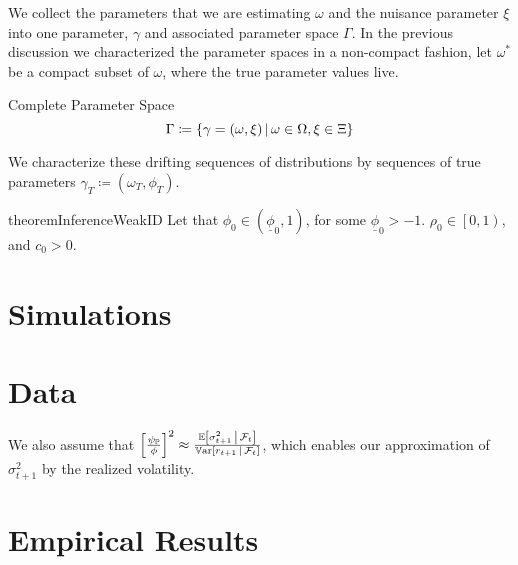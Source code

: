 \documentclass[11pt, letterpaper, twoside, final]{article}
\begin{document}
We collect the parameters that we are estimating $\omega$ and the nuisance parameter $\xi$ into one parameter,
$\gamma$ and associated parameter space $\Gamma$.
In the previous discussion we characterized the parameter spaces in a non-compact fashion, let $\omega^{*}$ be a
compact subset of $\omega$, where the true parameter values live.

\begin{defn}{Complete Parameter Space}
    \begin{equation}
        \Gamma \coloneqq \left\lbrace \gamma = (\omega, \xi) \,\middle\vert\, \omega \in \Omega, \xi \in \Xi \right\rbrace 
    \end{equation}
\end{defn}

We characterize these drifting sequences of distributions by sequences of true parameters $\gamma_T \coloneqq
(\omega_T, \phi_T)$.



\begin{restatable}{theorem}{InferenceWeakID}
    Let that $\phi_0  \in \left(\underline{\phi}_0,1\right)$, for some $\underline{\phi}_0 > -1$. 
    $\rho_0 \in \left[0,1\right)$, and $c_0 > 0$. 

\end{restatable}


\section{Simulations}

\section{Data}\label{sec:data}

We also assume that $\left[ \frac{\psi_{\mathbb{P}}}{\phi} \right]^2 \approx \frac{\operatorname{\mathbb{E}} \left[\sigma^2_{t+1} \,\middle\vert\,
\mathcal{F}_t\right]}{\operatorname{\mathbb{V}ar}\left[r_{t+1} \,\middle\vert\, \mathcal{F}_t\right]}$, which enables our approximation of $\sigma^2_{t+1}$ by the
realized volatility.

\section{Empirical Results}
\end{document}
